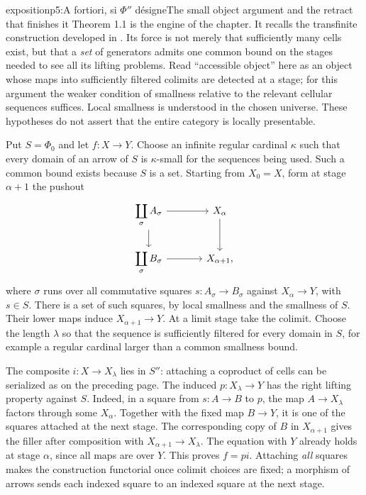 \begin{dcomment}{exposition}{p5:A fortiori, si $\Phi''$ désigne}{The small object argument and the retract that finishes it}
Theorem 1.1 is the engine of the chapter. It recalls the transfinite construction developed in \citet[Chapter~XV, \S1, Theorem~1]{Grothendieck1990XV}. Its force is not merely that sufficiently many cells exist, but that a \emph{set} of generators admits one common bound on the stages needed to see all its lifting problems. Read ``accessible object'' here as an object whose maps into sufficiently filtered colimits are detected at a stage; for this argument the weaker condition of smallness relative to the relevant cellular sequences suffices. Local smallness is understood in the chosen universe. These hypotheses do not assert that the entire category is locally presentable.

Put $S=\Phi_0$ and let $f:X\to Y$. Choose an infinite regular cardinal $\kappa$ such that every domain of an arrow of $S$ is $\kappa$-small for the sequences being used. Such a common bound exists because $S$ is a set. Starting from $X_0=X$, form at stage $\alpha+1$ the pushout
\[
\begin{tikzcd}[column sep=large]
\displaystyle\coprod_{\sigma} A_\sigma\arrow[r]\arrow[d] & X_\alpha\arrow[d]\\
\displaystyle\coprod_{\sigma} B_\sigma\arrow[r] & X_{\alpha+1},
\end{tikzcd}
\]
where $\sigma$ runs over all commutative squares $s:A_\sigma\to B_\sigma$ against $X_\alpha\to Y$, with $s\in S$. There is a set of such squares, by local smallness and the smallness of $S$. Their lower maps induce $X_{\alpha+1}\to Y$. At a limit stage take the colimit. Choose the length $\lambda$ so that the sequence is sufficiently filtered for every domain in $S$, for example a regular cardinal larger than a common smallness bound.

The composite $i:X\to X_\lambda$ lies in $S''$: attaching a coproduct of cells can be serialized as on the preceding page. The induced $p:X_\lambda\to Y$ has the right lifting property against $S$. Indeed, in a square from $s:A\to B$ to $p$, the map $A\to X_\lambda$ factors through some $X_\alpha$. Together with the fixed map $B\to Y$, it is one of the squares attached at the next stage. The corresponding copy of $B$ in $X_{\alpha+1}$ gives the filler after composition with $X_{\alpha+1}\to X_\lambda$. The equation with $Y$ already holds at stage $\alpha$, since all maps are over $Y$. This proves $f=pi$. Attaching \emph{all} squares makes the construction functorial once colimit choices are fixed; a morphism of arrows sends each indexed square to an indexed square at the next stage.


\end{dcomment}
